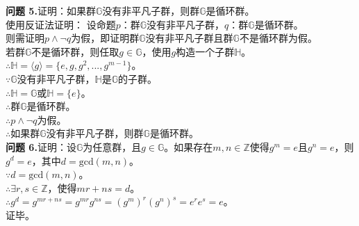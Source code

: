 \documentclass[a4paper]{CINTA}
\begin{document}
\textbf{问题 5.}证明：如果群$\mathbb{G}$没有非平凡子群，则群$\mathbb{G}$是循环群。\\
使用反证法证明：
设命题$p$：群$\mathbb{G}$没有非平凡子群，$q$：群$\mathbb{G}$是循环群。\\
则需证明$p \wedge \neg q$为假，即证明群$\mathbb{G}$没有非平凡子群且群$\mathbb{G}$不是循环群为假。\\
若群$\mathbb{G}$不是循环群，则任取$g \in \mathbb{G}$，使用$g$构造一个子群$\mathbb{H}$。\\
$\therefore \mathbb{H}=\langle g \rangle=\{e,g,g^2,...,g^{m-1}\}$。\\
$\because \mathbb{G}$没有非平凡子群，$\mathbb{H}$是$\mathbb{G}$的子群。\\
$\therefore \mathbb{H}=\mathbb{G}$或$\mathbb{H}=\{e\}$。\\
$\therefore$群$\mathbb{G}$是循环群。\\
$\therefore p \wedge \neg q$为假。\\
$\therefore$如果群$\mathbb{G}$没有非平凡子群，则群$\mathbb{G}$是循环群。\\

\textbf{问题 6.}证明：设$\mathbb{G}$为任意群，且$g\in \mathbb{G}$。如果存在$m, n \in \mathbb{Z}$使得$g^m = e$且$g^n = e$，则$g^d = e$，其中$d = \text{gcd}(m, n)$。\\
$\because d=\text{gcd}(m, n)$。\\
$\therefore \exists r,s \in \mathbb{Z}$，使得$mr+ns=d$。\\
$\therefore g^d=g^{mr+ns}=g^{mr}g^{ns}=(g^m)^r(g^n)^s=e^r e^s=e$。\\
证毕。\\
\end{document}
